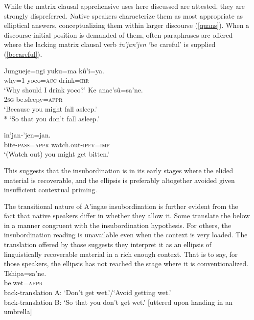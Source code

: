 \documentclass[output=paper,colorlinks,citecolor=brown]{langscibook}
\begin{document}
While the matrix clausal apprehensive uses here discussed are attested, they are strongly dispreferred. Native speakers characterize them as most appropriate as elliptical answers, conceptualizing them within larger discourse (\ref{quans}). When a dis\-course-initial position is demanded of them, often paraphrases are offered where the lacking matrix clausal verb \emph{in'jan'jen} `be careful' is supplied (\ref{becareful}).
\begin{exe} 
    \ex \label{quans} \begin{xlist}
     \gll Jungueje=ngi yuku=ma kû'i=ya. \\
             why\textsc{=}1     yoco=\textsc{acc} drink=\textsc{irr} \\
        \glt `Why should I drink yoco?'
     \gll {\ob}Ke anae'sû=sa'ne.{\cb} \\
            \textsc{2sg} {be.sleepy=\textsc{appr}} \\
        \glt `Because you might fall asleep.' \\*
             `So that you don't fall asleep.'
    \end{xlist}
    \ex \label{becareful}
     in'jan-'jen=jan. \\
         bite-\textsc{pass=appr} {watch.out-\textsc{ipfv=imp}} \\
    \glt `(Watch out) you might get bitten.'
\end{exe}

This suggests that the insubordination is in its early stages where the elided material is recoverable, and the ellipsis is preferably altogether avoided given insufficient contextual priming. 

The transitional nature of A'ingae insubordination is further evident from the fact that native speakers differ in whether they allow it. Some translate the below in a manner congruent with the insubordination hypothesis. For others, the insubordination reading is unavailable even when the context is very loaded. The translation offered by those suggests they interpret it as an ellipsis of linguistically recoverable material in a rich enough context. That is to say, for those speakers, the ellipsis has not reached the stage where it is conventionalized. 
    \ea \label{tshipasane}
    \gll {\ob}Tshipa=sa'ne.{\cb} \\
         {be.wet}=\textsc{appr} \\
    \glt back-translation A: `Don't get wet.'/`Avoid getting wet.'\\
         back-translation B: `So that you don't get wet.' [uttered upon handing in an umbrella]
    \z
    
\end{document}
